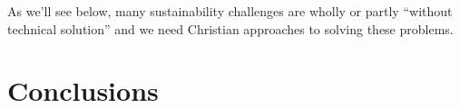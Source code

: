 \documentclass[12pt]{article}
\begin{document}
As we'll see below, many sustainability challenges are wholly or partly ``without technical solution'' and we need
Christian approaches to solving these problems.






\section{Conclusions}
\label{sec:conclusions}



\printbibliography
\end{document}
